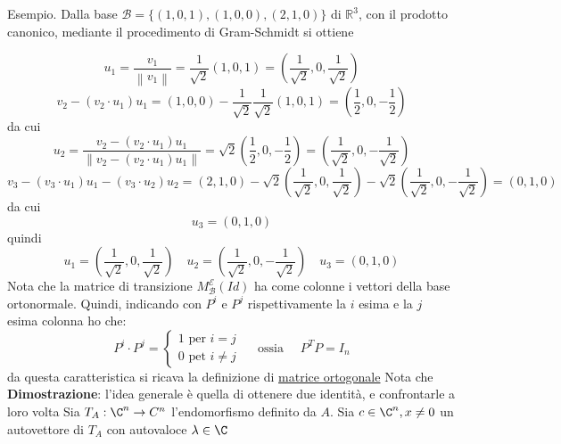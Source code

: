 \documentclass[12pt,a4paper,oneside]{article}
\begin{document}
Esempio. Dalla base $\mathcal{B}=\{(1,0,1),(1,0,0),(2,1,0)\}$ di $\mathbb{R}^3$, con il prodotto canonico, mediante il procedimento di Gram-Schmidt si ottiene

\[
	u_1=\frac{v_1}{\left\|v_1\right\|}=\frac{1}{\sqrt{2}}(1,0,1)=\left(\frac{1}{\sqrt{2}}, 0, \frac{1}{\sqrt{2}}\right)
\]
\[
	v_2-\left(v_2 \cdot u_1\right) u_1=(1,0,0)-\frac{1}{\sqrt{2}} \frac{1}{\sqrt{2}}(1,0,1)=\left(\frac{1}{2}, 0,-\frac{1}{2}\right)
\]
da cui
\[
	u_2=\frac{v_2-\left(v_2 \cdot u_1\right) u_1}{\left\|v_2-\left(v_2 \cdot u_1\right) u_1\right\|}=\sqrt{2}\left(\frac{1}{2}, 0,-\frac{1}{2}\right)=\left(\frac{1}{\sqrt{2}}, 0,-\frac{1}{\sqrt{2}}\right)
\]
\[
	v_3-\left(v_3 \cdot u_1\right) u_1-\left(v_3 \cdot u_2\right) u_2=(2,1,0)-\sqrt{2}\left(\frac{1}{\sqrt{2}}, 0, \frac{1}{\sqrt{2}}\right)-\sqrt{2}\left(\frac{1}{\sqrt{2}}, 0,-\frac{1}{\sqrt{2}}\right)=(0,1,0)
\]
da cui
\[
	u_3=(0,1,0)
\]
quindi
\[
	u_1 = \left( \frac{1}{\sqrt{2} },0, \frac{1}{\sqrt{2} } \right) \quad u_2= \left( \frac{1}{\sqrt{2} },0,-\frac{1}{\sqrt{2} } \right) \quad  u_3= \left( 0,1,0 \right)
\]
Nota che la matrice di transizione $ M_{ \mathcal{B}}^{ \mathcal{E}} \left( Id \right)  $ ha come colonne i vettori della base ortonormale. Quindi, indicando con $ P^{i} $ e $ P^{j} $ rispettivamente la $ i $ esima e la $ j $ esima colonna ho che:
\[
	P^{i}\cdot P^{j}=
	\begin{cases}
		1 \text{ per }i = j \\
		0 \text{ pet }i \neq j
	\end{cases}
	\quad \text{ ossia } \quad
	P^{T} P = I_n
\]
da questa caratteristica si ricava la definizione di \underline{matrice ortogonale}
Nota che
\label{teo:prerequisitoSpettrale}
\textbf{Dimostrazione}: l'idea generale è quella di ottenere due identità, e confrontarle a loro volta
\vskip3mm
Sia $ T_A:\C ^{n} \to C^{n} $ l'endomorfismo definito da $ A $. Sia $  c \in \C^{n}, x \neq 0 $ un autovettore di $  T_A $ con autovaloce $ \lambda  \in \C $
\end{document}

